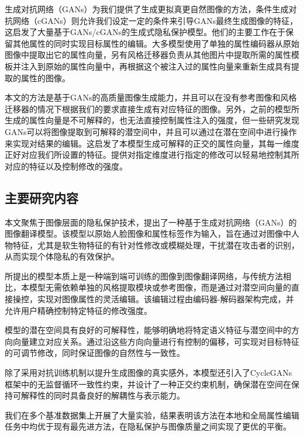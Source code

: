\documentclass[UTF8,a4paper,12pt]{ctexart}
\numberwithin{equation}{section}
\begin{document}
生成对抗网络（GANs）为我们提供了生成更拟真更自然图像的方法\cite{Generative adversarial nets.}，条件生成对抗网络（cGANs）则允许我们设定一定的条件来引导GANs最终生成图像的特征，这启发了大量基于GANs/cGANs的生成式隐私保护模型\cite{Privacy-Protective-GAN for Face De-identification, Image-to-image Translation via Hierarchical Style Disentanglement, Stargan v2: Diverse image synthesis for multiple domains}。他们的主要工作在于保留其他属性的同时实现目标属性的编辑。大多模型使用了单独的属性编码器从原始图像中提取出它的属性向量，另有风格迁移器负责从其他图片中提取所需的属性模板并注入到原始的属性向量中，再根据这个被注入过的属性向量来重新生成具有提取的属性的图像。

本文的方法是基于GANs的高质量图像生成能力，并且可以在没有参考图像和风格迁移器的情况下根据我们的要求直接生成有对应特征的图像。另外，之前的模型所生成的属性向量是不可解释的，也无法直接控制属性注入的强度，但一些研究\cite{Interpreting the latent space of GANs for semantic face editing}发现GANs可以将图像提取到可解释的潜空间中，并且可以通过在潜在空间中进行操作来实现对结果的编辑。这启发了本模型生成可解释的正交的属性向量，其每一维度正好对应我们所设置的特征。提供对指定维度进行指定的修改可以轻易地控制其所对应的特征以及控制修改的强度。

\subsection{主要研究内容}
本文聚焦于图像层面的隐私保护技术，提出了一种基于生成对抗网络（GANs）的图像翻译模型。该模型以原始人脸图像和属性标签作为输入，旨在通过对图像中人物特征，尤其是软生物特征的有针对性修改或模糊处理，干扰潜在攻击者的识别，从而实现个体隐私的有效保护。

所提出的模型本质上是一种端到端可训练的图像到图像翻译网络，与传统方法相比，本模型无需依赖单独的风格提取模块或参考图像，而是通过对潜空间向量的直接操控，实现对图像属性的灵活编辑。该编辑过程由编码器-解码器架构完成，并允许用户精确控制特定特征的修改强度。

模型的潜在空间具有良好的可解释性，能够明确地将特定语义特征与潜空间中的方向向量建立对应关系。通过沿这些方向向量进行有控制的偏移，可实现对目标特征的可调节修改，同时保证图像的自然性与一致性。

除了采用对抗训练机制以提升生成图像的真实感外，本模型还引入了CycleGANs框架中的无监督循环一致性约束，并设计了一种正交约束机制，确保潜在空间在保持可解释性的同时具备良好的解耦性与表示能力。

我们在多个基准数据集上开展了大量实验，结果表明该方法在本地和全局属性编辑任务中均优于现有最先进方法，在隐私保护与图像质量之间实现了更优的平衡。
\end{document}
